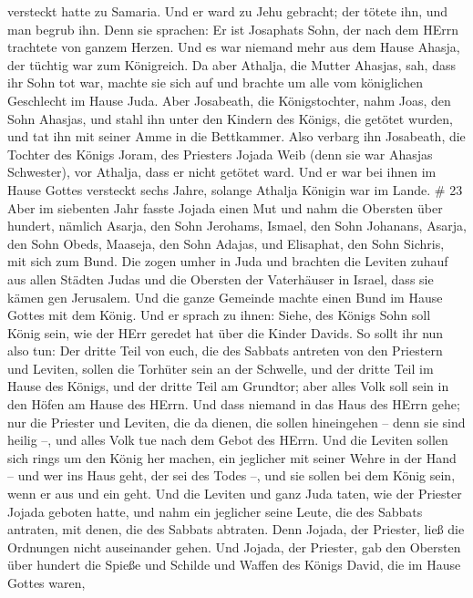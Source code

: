 versteckt hatte zu Samaria. Und er ward zu Jehu gebracht; der tötete
ihn, und man begrub ihn. Denn sie sprachen: Er ist Josaphats Sohn, der
nach dem HErrn trachtete von ganzem Herzen. Und es war niemand mehr aus
dem Hause Ahasja, der tüchtig war zum Königreich.  Da aber
Athalja, die Mutter Ahasjas, sah, dass ihr Sohn tot war, machte sie sich
auf und brachte um alle vom königlichen Geschlecht im Hause Juda.
 Aber Josabeath, die Königstochter, nahm Joas, den Sohn
Ahasjas, und stahl ihn unter den Kindern des Königs, die getötet wurden,
und tat ihn mit seiner Amme in die Bettkammer. Also verbarg ihn
Josabeath, die Tochter des Königs Joram, des Priesters Jojada Weib (denn
sie war Ahasjas Schwester), vor Athalja, dass er nicht getötet ward.
 Und er war bei ihnen im Hause Gottes versteckt sechs
Jahre, solange Athalja Königin war im Lande. \# 23  Aber im
siebenten Jahr fasste Jojada einen Mut und nahm die Obersten über
hundert, nämlich Asarja, den Sohn Jerohams, Ismael, den Sohn Johanans,
Asarja, den Sohn Obeds, Maaseja, den Sohn Adajas, und Elisaphat, den
Sohn Sichris, mit sich zum Bund.  Die zogen umher in Juda
und brachten die Leviten zuhauf aus allen Städten Judas und die Obersten
der Vaterhäuser in Israel, dass sie kämen gen Jerusalem. 
Und die ganze Gemeinde machte einen Bund im Hause Gottes mit dem König.
Und er sprach zu ihnen: Siehe, des Königs Sohn soll König sein, wie der
HErr geredet hat über die Kinder Davids.  So sollt ihr nun
also tun: Der dritte Teil von euch, die des Sabbats antreten von den
Priestern und Leviten, sollen die Torhüter sein an der Schwelle,
 und der dritte Teil im Hause des Königs, und der dritte
Teil am Grundtor; aber alles Volk soll sein in den Höfen am Hause des
HErrn.  Und dass niemand in das Haus des HErrn gehe; nur die
Priester und Leviten, die da dienen, die sollen hineingehen -- denn sie
sind heilig --, und alles Volk tue nach dem Gebot des HErrn.
 Und die Leviten sollen sich rings um den König her machen,
ein jeglicher mit seiner Wehre in der Hand -- und wer ins Haus geht, der
sei des Todes --, und sie sollen bei dem König sein, wenn er aus und ein
geht.  Und die Leviten und ganz Juda taten, wie der Priester
Jojada geboten hatte, und nahm ein jeglicher seine Leute, die des
Sabbats antraten, mit denen, die des Sabbats abtraten. Denn Jojada, der
Priester, ließ die Ordnungen nicht auseinander gehen.  Und
Jojada, der Priester, gab den Obersten über hundert die Spieße und
Schilde und Waffen des Königs David, die im Hause Gottes waren,

